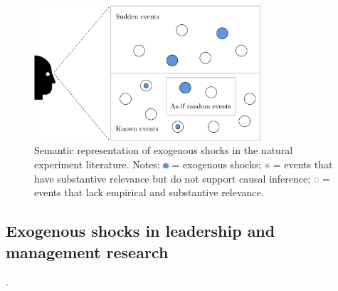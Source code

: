 \begin{refsection}
\begin{figure}[!htbp]
  \centering
  \includegraphics[width=0.75\textwidth]{exhibits/exogenous_shocks_and_ne.pdf}
  \caption{Semantic representation of exogenous shocks in the natural 
  experiment literature. Notes:  
  \includegraphics[width=0.0175\textwidth]{exhibits/exogenous_shocks_and_ne_0.pdf}
  = exogenous shocks;
  \includegraphics[width=0.0175\textwidth]{exhibits/exogenous_shocks_and_ne_1.pdf}
  = events that have substantive relevance but do not support causal inference;
  \includegraphics[width=0.0175\textwidth]{exhibits/exogenous_shocks_and_ne_2.pdf}
  = events that lack empirical and substantive relevance.}
  \label{fig:exogeneous_shocks_and_ne}
\end{figure}

\subsection{Exogenous shocks in leadership and management research}
\label{subsec:exogenous_shocks_in_management}

.


\end{refsection}
